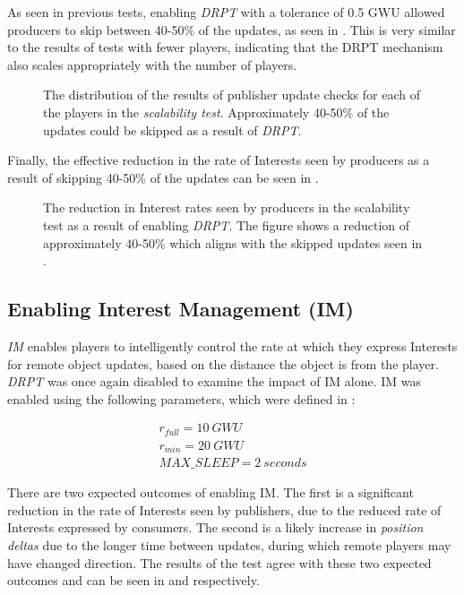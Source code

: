 As seen in previous tests, enabling \textit{DRPT} with a tolerance of 0.5 GWU allowed producers to skip between 40-50\% of the updates, as seen in . This is very similar to the results of tests with fewer players, indicating that the DRPT mechanism also scales appropriately with the number of players.

\begin{figure}[H]
    \centering
    \caption{The distribution of the results of publisher update checks for each of the players in the \textit{scalability test}. Approximately 40-50\% of the updates could be skipped as a result of \textit{DRPT}.}
    \label{fig:eval:dr:dr-pub-throt}
\end{figure}

Finally, the effective reduction in the rate of Interests seen by producers as a result of skipping 40-50\% of the updates can be seen in .

\begin{figure}[H]
    \centering
    \caption{The reduction in Interest rates seen by producers in the scalability test as a result of enabling \textit{DRPT}. The figure shows a reduction of approximately 40-50\% which aligns with the skipped updates seen in .}
    \label{fig:eval:dr:interest-rate-impacts}
\end{figure}


\subsection{Enabling Interest Management (IM)}
\textit{IM} enables players to intelligently control the rate at which they express Interests for remote object updates, based on the distance the object is from the player. \textit{DRPT} was once again disabled to examine the impact of IM alone. IM was enabled using the following parameters, which were defined in :

\begin{gather*}
    r_{full} = 10\ GWU\\
    r_{min} = 20\ GWU\\
    MAX\_SLEEP = 2\ seconds
\end{gather*}

There are two expected outcomes of enabling IM. The first is a significant reduction in the rate of Interests seen by publishers, due to the reduced rate of Interests expressed by consumers. The second is a likely increase in \textit{position deltas} due to the longer time between updates, during which remote players may have changed direction. The results of the test agree with these two expected outcomes and can be seen in  and  respectively.

